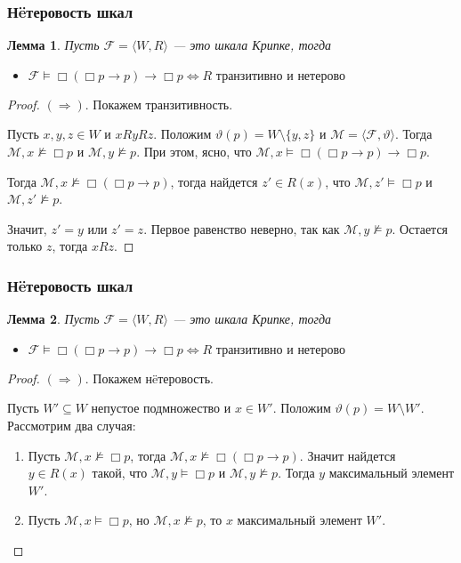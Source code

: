 \documentclass[pdf,utf8,russian,aspectratio=169]{beamer}
\newtheorem{lem}{Лемма}
\begin{document}
\begin{frame}
  \frametitle{Н\"{e}теровость шкал}
\begin{lem}
  Пусть $\mathcal{F} = \langle W, R \rangle$ --- это шкала Крипке, тогда

\begin{itemize}
  \item $\mathcal{F} \models \Box (\Box p \to p) \to \Box p \Leftrightarrow R \text{ транзитивно и н\"{е}терово}$
\end{itemize}
\end{lem}

\begin{proof}
  $(\Rightarrow)$. Покажем транзитивность.

  Пусть $x, y, z \in W$ и $x R y R z$. Положим $\vartheta(p) = W \setminus \{ y, z \}$ и $\mathcal{M} = \langle \mathcal{F}, \vartheta \rangle$. Тогда
  $\mathcal{M}, x \not\models \Box p$ и $\mathcal{M}, y \not\models p$. При этом, ясно, что $\mathcal{M}, x \models \Box (\Box p \to p) \to \Box p$.

  Тогда $\mathcal{M}, x \not\models \Box (\Box p \to p)$, тогда найдется $z' \in R(x)$, что $\mathcal{M}, z' \models \Box p$ и $\mathcal{M}, z' \not\models p$.

  Значит, $z' = y$ или $z' = z$. Первое равенство неверно, так как $\mathcal{M}, y \not\models p$. Остается только $z$, тогда $x R z$.
\end{proof}
\end{frame}

\begin{frame}
  \frametitle{Н\"{e}теровость шкал}
\begin{lem}
  Пусть $\mathcal{F} = \langle W, R \rangle$ --- это шкала Крипке, тогда

\begin{itemize}
  \item $\mathcal{F} \models \Box (\Box p \to p) \to \Box p \Leftrightarrow R \text{ транзитивно и н\"{е}терово}$
\end{itemize}
\end{lem}

\begin{proof}
  $(\Rightarrow)$. Покажем н\"{e}теровость.

  Пусть $W' \subseteq W$ непустое подмножество и $x \in W'$. Положим $\vartheta(p) = W \setminus W'$. Рассмотрим два случая:

\begin{enumerate}
  \item Пусть $\mathcal{M}, x \not\models \Box p$, тогда $\mathcal{M}, x \not\models \Box (\Box p \to p)$. Значит найдется $y \in R(x)$ такой,
  что $\mathcal{M}, y \models \Box p$ и $\mathcal{M}, y \not\models p$. Тогда $y$ максимальный элемент $W'$.
  \item Пусть $\mathcal{M}, x \models \Box p$, но $\mathcal{M}, x \not\models p$, то $x$ максимальный элемент $W'$.
\end{enumerate}
\end{proof}
\end{frame}
\end{document}
